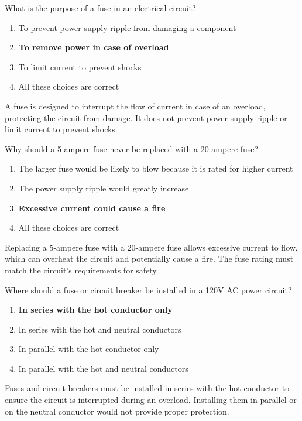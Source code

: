 \begin{tcolorbox}[colback=gray!10!white,colframe=black!75!black,title={T0A04}]
    What is the purpose of a fuse in an electrical circuit?
    \begin{enumerate}[label=\Alph*),noitemsep]
        \item To prevent power supply ripple from damaging a component
        \item \textbf{To remove power in case of overload}
        \item To limit current to prevent shocks
        \item All these choices are correct
    \end{enumerate}
\end{tcolorbox}
A fuse is designed to interrupt the flow of current in case of an overload, protecting the circuit from damage. It does not prevent power supply ripple or limit current to prevent shocks.

\begin{tcolorbox}[colback=gray!10!white,colframe=black!75!black,title={T0A05}]
    Why should a 5-ampere fuse never be replaced with a 20-ampere fuse?
    \begin{enumerate}[label=\Alph*),noitemsep]
        \item The larger fuse would be likely to blow because it is rated for higher current
        \item The power supply ripple would greatly increase
        \item \textbf{Excessive current could cause a fire}
        \item All these choices are correct
    \end{enumerate}
\end{tcolorbox}
Replacing a 5-ampere fuse with a 20-ampere fuse allows excessive current to flow, which can overheat the circuit and potentially cause a fire. The fuse rating must match the circuit's requirements for safety.

\begin{tcolorbox}[colback=gray!10!white,colframe=black!75!black,title={T0A08}]
    Where should a fuse or circuit breaker be installed in a 120V AC power circuit?
    \begin{enumerate}[label=\Alph*),noitemsep]
        \item \textbf{In series with the hot conductor only}
        \item In series with the hot and neutral conductors
        \item In parallel with the hot conductor only
        \item In parallel with the hot and neutral conductors
    \end{enumerate}
\end{tcolorbox}
Fuses and circuit breakers must be installed in series with the hot conductor to ensure the circuit is interrupted during an overload. Installing them in parallel or on the neutral conductor would not provide proper protection.

